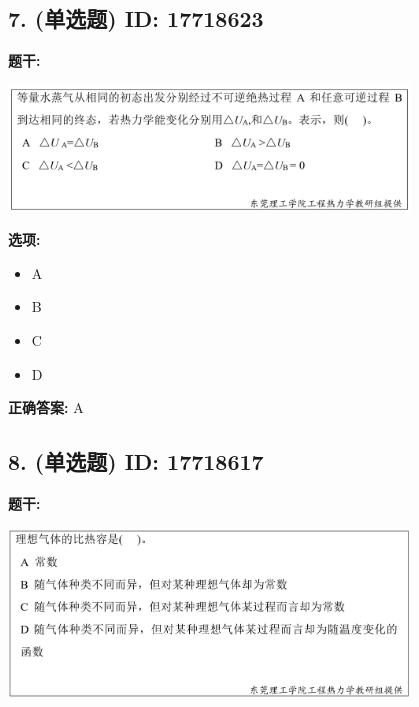\documentclass[12pt]{article}
\begin{document}
\subsection*{7. (单选题) \small ID: 17718623}

\textbf{题干:}


\begin{center}\includegraphics[width=0.8\textwidth, height=0.25\textheight, keepaspectratio]{question_7_17718623/title_img_1.png}\end{center}

\textbf{选项:}
\begin{itemize}[leftmargin=*]
  \item A

  \item B

  \item C

  \item D

\end{itemize}

\textbf{正确答案:}
A

\vspace{0.5em}\hrulefill\vspace{1em}

\subsection*{8. (单选题) \small ID: 17718617}

\textbf{题干:}


\begin{center}\includegraphics[width=0.8\textwidth, height=0.25\textheight, keepaspectratio]{question_8_17718617/title_img_1.png}\end{center}
\end{document}
